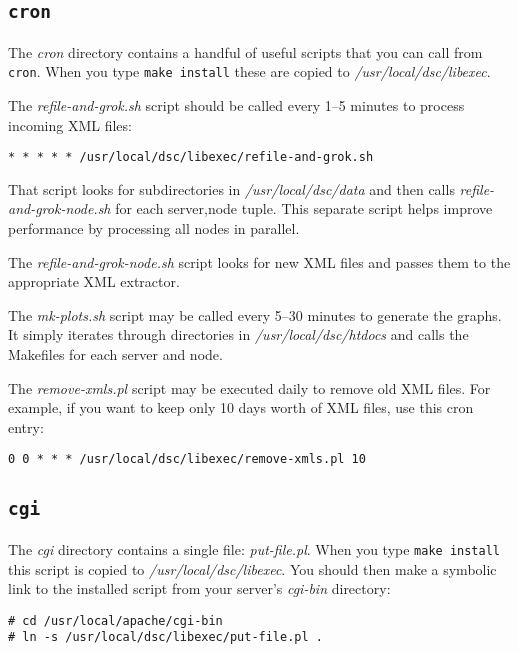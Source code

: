\documentclass{report}
\begin{document}
\subsection{\tt cron}

The {\em cron\/} directory contains a handful of useful scripts that you can
call from {\tt cron\/}.  When you type {\tt make install\/} these are copied
to {\em /usr/local/dsc/libexec\/}.

The {\em refile-and-grok.sh\/} script should be called every 1--5 minutes to process
incoming XML files:

\begin{verbatim}
* * * * * /usr/local/dsc/libexec/refile-and-grok.sh
\end{verbatim}

That script looks for subdirectories in {\em /usr/local/dsc/data\/}
and then calls {\em refile-and-grok-node.sh\/} for each server,node tuple.
This separate script helps improve performance by processing all nodes
in parallel.  

The {\em refile-and-grok-node.sh\/} script looks for new XML files and passes
them to the appropriate XML extractor.  

The {\em mk-plots.sh\/} script may be called every 5--30 minutes to generate
the graphs.  It simply iterates through directories in
{\em /usr/local/dsc/htdocs\/} and calls the Makefiles for each server and node.

The {\em remove-xmls.pl\/} script may be executed daily to 
remove old XML files.  For example, if you want to keep only 10 days
worth of XML files, use this cron entry:

\begin{verbatim}
0 0 * * * /usr/local/dsc/libexec/remove-xmls.pl 10
\end{verbatim}



\subsection{\tt cgi}

The {\em cgi\/} directory contains a single file: {\em put-file.pl\/}.
When you type {\tt make install\/} this script is copied to
{\em /usr/local/dsc/libexec\/}.  You should then make a symbolic link
to the installed script from your server's {\em cgi-bin\/} directory:

\begin{verbatim}
# cd /usr/local/apache/cgi-bin
# ln -s /usr/local/dsc/libexec/put-file.pl .
\end{verbatim}
\end{document}
